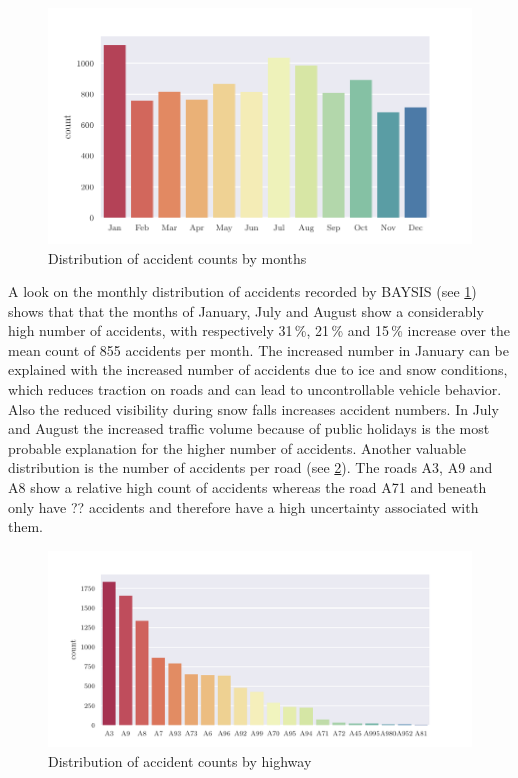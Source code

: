 \begin{figure}[ht]
	\centering
	\includegraphics[scale=0.9]{CorrAnalysis/data/BAYSIS/01_dataset/plots/baysis_dataset_hist_month}
	\caption{Distribution of accident counts by months}
	\label{img:baysis_dataset_dist_month}
\end{figure}
A look on the monthly distribution of accidents recorded by BAYSIS (see \cref{img:baysis_dataset_dist_month}) shows that that the months of January, July and August show a considerably high number of accidents, with respectively 31\,\%, 21\,\% and 15\,\% increase over the mean count of 855 accidents per month. The increased number in January can be explained with the increased number of accidents due to ice and snow conditions, which reduces traction on roads and can lead to uncontrollable vehicle behavior. Also the reduced visibility during snow falls increases accident numbers. In July and August the increased traffic volume because of public holidays is the most probable explanation for the higher number of accidents. Another valuable distribution is the number of accidents per road (see \cref{img:baysis_dataset_dist_highway}). The roads A3, A9 and A8 show a relative high count of accidents whereas the road A71 and beneath only have ?? accidents and therefore have a high uncertainty associated with them. 
\begin{figure}[ht]
	\centering
	\includegraphics[scale=0.75]{CorrAnalysis/data/BAYSIS/01_dataset/plots/baysis_dataset_hist_highway}
	\caption{Distribution of accident counts by highway}
	\label{img:baysis_dataset_dist_highway}
	\vspace{-8mm}
\end{figure}
